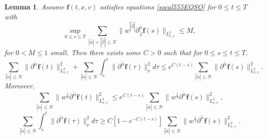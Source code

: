 \documentclass[reqno]{amsart}
\numberwithin{equation}{section}
\newtheorem{lemma}[theorem]{Lemma}
\numberwithin{equation}{section}
\begin{document}
		\begin{lemma}\label{socadLemm888}
			Assume $\mathbf{f}(t, x, v)$ satisfies equations \eqref{socal555EQSO} for $0 \le t \le T$ with
			\begin{equation}
			\sup_{0 \le s \le T} \sum_{|\tilde{\alpha}| + |\tilde{\beta}| \leq N} \big\| w^{| \tilde{\beta} |} \partial_{\tilde{\beta}}^{\tilde{\alpha}} \mathbf{f}(s)\big\|_{L^{2}_{x,v}} \leq M,\label{socad8080}
			\end{equation}
			for $0<M \leq 1$ small. Then there exists some $C > 0$ such that for $0 \le s \le t \le T$,
			\begin{equation}
			\sum_{|\tilde{\alpha}| \le N} \big\|\partial^{\tilde{\alpha}} \mathbf{f}(t)\big\|_{L^{2}_{x,v}}^2 + \sum_{|\tilde{\alpha}| \le N} \int_s^t \big\|\partial^{\tilde{\alpha}} \mathbf{f}(\tau)\big\|_{\nu}^2 d\tau \le e^{C(t - s)} \sum_{|\tilde{\alpha}| \le N} \big\|\partial^{\tilde{\alpha}} \mathbf{f}(s)\big\|_{L^{2}_{x,v}}^2.\label{socad8181}
			\end{equation}
			Moreover,
			\begin{equation}
			\sum_{|\tilde{\alpha}| \le N} \big\|w^{\frac{1}{2}} \partial^{\tilde{\alpha}} \mathbf{f}(t)\big\|_{L^{2}_{x,v}}^2 \le e^{C(t - s)} \sum_{|\tilde{\alpha}| \le N} \big\|w^{\frac{1}{2}} \partial^{\tilde{\alpha}} \mathbf{f}(s)\big\|^2_{L^{2}_{x,v}},\label{socad8282}
			\end{equation}
			\begin{equation}
			\sum_{|\tilde{\alpha}| \le N} \int_s^t \big\|\partial^{\tilde{\alpha}} \mathbf{f}(\tau)\big\|_{\nu}^2 d\tau \ge C\left[1 - e^{-C(t - s)}\right] \sum_{|\tilde{\alpha}| \le N} \big\|w^{\frac{1}{2}} \partial^{\tilde{\alpha}} \mathbf{f}(s)\big\|^2_{L^{2}_{x,v}}.\label{socad8383}
			\end{equation}
		\end{lemma}
\end{document}
